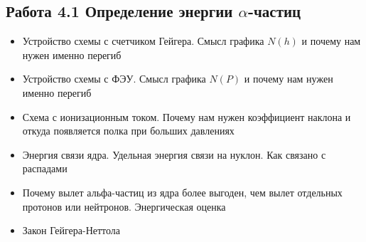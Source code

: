 \documentclass[12pt]{article}
\begin{document}
\subsection*{Работа 4.1 Определение энергии $\alpha$-частиц}
\begin{itemize}
    \item Устройство схемы с счетчиком Гейгера. Смысл графика $N(h)$ и почему нам нужен именно перегиб
    \item Устройство схемы с ФЭУ. Смысл графика $N(P)$ и почему нам нужен именно перегиб
    \item Схема с ионизационным током. Почему нам нужен коэффициент наклона и откуда появляется полка при больших давлениях
    \item Энергия связи ядра. Удельная энергия связи на нуклон. Как связано с распадами
    \item Почему вылет альфа-частиц из ядра более выгоден, чем вылет отдельных протонов или нейтронов. Энергическая оценка
    \item Закон Гейгера-Неттола
\end{itemize}
\end{document}
